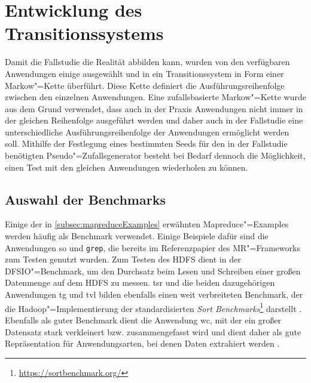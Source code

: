 \section{Entwicklung des Transitionssystems}
\label{sec:transitionsystem}

Damit die Fallstudie die Realität abbilden kann, wurden von den verfügbaren Anwendungen einige ausgewählt und in ein Transitionssystem in Form einer Markow"=Kette überführt.
Diese Kette definiert die Ausführungsreihenfolge zwischen den einzelnen Anwendungen.
Eine zufallsbasierte Markow"=Kette wurde aus dem Grund verwendet, dass auch in der Praxis Anwendungen nicht immer in der gleichen Reihenfolge ausgeführt werden und daher auch in der Fallstudie eine unterschiedliche Ausführungsreihenfolge der Anwendungen ermöglicht werden soll.
Mithilfe der Festlegung eines bestimmten Seeds für den in der Fallstudie benötigten Pseudo"=Zufallsgenerator besteht bei Bedarf dennoch die Möglichkeit, einen Test mit den gleichen Anwendungen wiederholen zu können.

\subsection{Auswahl der Benchmarks}
\label{subsec:appSelection}

Einige der in \cref{subsec:mapreduceExamples} erwähnten Mapreduce"=Examples werden häufig als Benchmark verwendet.
Einige Beispiele dafür sind die Anwendungen \acrlong{so} und \texttt{grep}, die bereits im Referenzpapier \cite{Dean2004} des \gls{MR}"=Frameworks zum Testen genutzt wurden.
Zum Testen des HDFS dient in \cite{Shvachko2010} der DFSIO"=Benchmark, um den Durchsatz beim Lesen und Schreiben einer großen Datenmenge auf dem HDFS zu messen.
\acrlong{tsr} und die beiden dazugehörigen Anwendungen \acrlong{tg} und \acrlong{tvl} bilden ebenfalls einen weit verbreiteten Benchmark, der die Hadoop"=Implementierung der standardisierten \emph{Sort Benchmarks}\footnote{\url{https://sortbenchmark.org/}} darstellt \cite{Graves2013}.
Ebenfalls als guter Benchmark dient die Anwendung \acrlong{wc}, mit der ein großer Datensatz stark verkleinert bzw. zusammengefasst wird und dient daher als gute Repräsentation für Anwendungsarten, bei denen Daten extrahiert werden \cite{Huang2010,Chen2012}.

